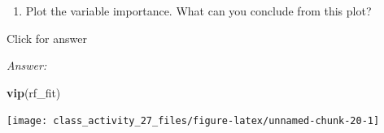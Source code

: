 \documentclass[
]{book}
\newenvironment{Shaded}{\begin{snugshade}}{\end{snugshade}}
\newcommand{\FunctionTok}[1]{\textcolor[rgb]{0.13,0.29,0.53}{\textbf{#1}}}
\newcommand{\NormalTok}[1]{#1}
\providecommand{\tightlist}{%
  \setlength{\itemsep}{0pt}\setlength{\parskip}{0pt}}
\begin{document}
\begin{enumerate}
\def\labelenumi{\alph{enumi}.}
\setcounter{enumi}{6}
\tightlist
\item
  Plot the variable importance. What can you conclude from this plot?
\end{enumerate}

Click for answer

\emph{Answer:}

\begin{Shaded}
\begin{Highlighting}[]
\FunctionTok{vip}\NormalTok{(rf\_fit)}
\end{Highlighting}
\end{Shaded}

\texttt{[image: class\_activity\_27\_files/figure-latex/unnamed-chunk-20-1]}

  
\end{document}
